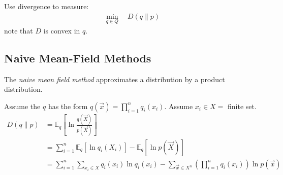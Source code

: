\documentclass[11pt,a4paper]{article}
\begin{document}
Use divergence to measure:
\begin{equation}
    \begin{aligned}
        \min_{q\in Q}\quad D(q\| p)
    \end{aligned}
    \nonumber
\end{equation}
note that $D$ is convex in $q$.

\subsection{Naive Mean-Field Methods}
The \textit{naive mean field method} approximates a distribution by a product distribution.

Assume the $q$ has the form $q(\vec{x})=\prod_{i=1}^nq_i (x_i)$. Assume $x_i\in X=$ finite set.
\begin{equation}
    \begin{aligned}
        D(q\| p)&=\mathbb{E}_q\left[\ln\frac{q(\vec{X})}{p(\vec{X})}\right]\\
        &=\sum_{i=1}^n \mathbb{E}_{q}\left[\ln q_i(X_i)\right]- \mathbb{E}_q\left[\ln p(\vec{X})\right]\\
        &=\sum_{i=1}^n\sum_{x_i\in X}q_i(x_i)\ln q_i(x_i)-\sum_{\vec{x}\in X^n}\left(\prod_{i=1}^nq_i (x_i)\right)\ln p(\vec{x})
    \end{aligned}
    \nonumber
\end{equation}
\end{document}
